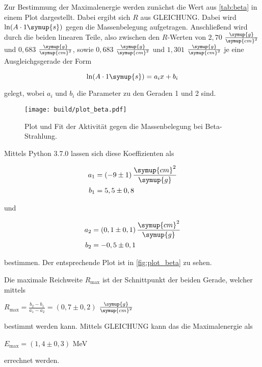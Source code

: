Zur Bestimmung der Maximalenergie werden zunächst die Wert aus \autoref{tab:beta} in einem Plot dargestellt.
Dabei ergibt sich $R$ aus GLEICHUNG. Dabei wird $\ln(A \cdot 1 \symup{s})$ gegen die Massenbelegung aufgetragen.
Anschließend wird durch die beiden linearen Teile,
also zwischen den $R$-Werten von $2,70$ $\frac{\symup{g}}{\symup{cm}^2}$ und $0,683$ $\frac{\symup{g}}{\symup{cm}^2}$, 
sowie $0,683$ $\frac{\symup{g}}{\symup{cm}^2}$ und $1,301$ $\frac{\symup{g}}{\symup{cm}^2}$ je eine Ausgleichgsgerade der Form

\begin{equation}
    \ln(A \cdot 1 \symup{s}) = a_i x + b_i
\end{equation}

gelegt, wobei $a_i$ und $b_i$ die Parameter zu den Geraden 1 und 2 sind.



\begin{figure}
    \centering
    \texttt{[image: build/plot\_beta.pdf]}
    \caption{Plot und Fit der Aktivität gegen die Massenbelegung bei Beta-Strahlung.}
    \label{fig:plot_beta}
\end{figure}

Mittels Python 3.7.0 lassen sich diese Koeffizienten als

\begin{align*}
    a_1 &= (-9 \pm 1) \, \frac{\symup{cm}^2}{\symup{g}}\\
    b_1 &= 5,5 \pm 0,8
\end{align*}

und

\begin{align*}
    a_2 &= (0,1 \pm 0,1) \, \frac{\symup{cm}^2}{\symup{g}}\\
    b_2 &= -0,5 \pm 0,1
\end{align*}

bestimmen. Der entsprechende Plot ist in \autoref{fig:plot_beta} zu sehen.

Die maximale Reichweite $R_\text{max}$ ist der Schnittpunkt der beiden Gerade, welcher mittels

\begin{center}
    $R_\text{max} = \frac{b_2 - b_1}{a_1 - a_2} = (0,7 \pm 0,2)$ $\frac{\symup{g}}{\symup{cm}^2}$
\end{center}

bestimmt werden kann. Mittels GLEICHUNG kann das die Maximalenergie als

\begin{center}
    $E_\text{max} = (1,4 \pm 0,3)$ MeV
\end{center}

errechnet werden.
